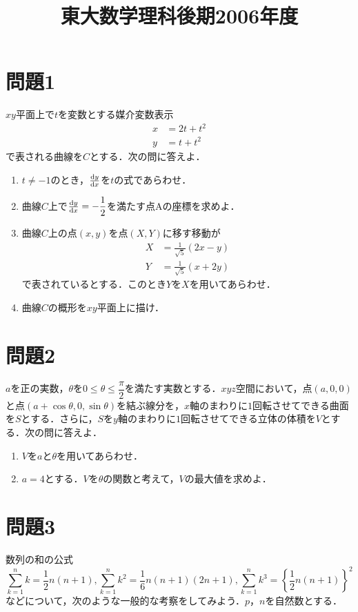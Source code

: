 \documentclass[unicode,12pt, A4j]{ltjsarticle}%
\title{東大数学理科後期2006年度}
\author{}
\date{}
\begin{document}
\maketitle

\section{問題1}
$xy$平面上で$t$を変数とする媒介変数表示
\begin{align}
 x&=2t+t^2 \\
 y&=t+t^2  
\end{align}
で表される曲線を$C$とする．次の問に答えよ．
\begin{enumerate}
 \item $t\neq -1$のとき，$\dv{y}{x}$を$t$の式であらわせ．
 \item 曲線$C$上で$\dv{y}{x}=-\dfrac{1}{2}$を満たす点$\mathrm{A}$の座標を求めよ．
 \item 曲線$C$上の点$(x,y)$を点$(X,Y)$に移す移動が
       \begin{align}
	  X&=\frac{1}{\sqrt{5}}(2x-y) \\
	  Y&=\frac{1}{\sqrt{5}}(x+2y) 
       \end{align}
       で表されているとする．このとき$Y$を$X$を用いてあらわせ．
 \item 曲線$C$の概形を$xy$平面上に描け．
\end{enumerate}


\section{問題2}
$a$を正の実数，$\theta$を$0\le\theta\le\dfrac{\pi}{2}$を満たす実数とする．$xyz$空間において，点$(a,0,0)$と点$(a+\cos\theta,0,\sin\theta)$を結ぶ線分を，$x$軸のまわりに$1$回転させてできる曲面を$S$とする．さらに，$S$を$y$軸のまわりに$1$回転させてできる立体の体積を$V$とする．次の問に答えよ．
\begin{enumerate}
 \item $V$を$a$と$\theta$を用いてあらわせ．
 \item $a=4$とする．$V$を$\theta$の関数と考えて，$V$の最大値を求めよ．
\end{enumerate}


\section{問題3}
数列の和の公式
\begin{equation}
 \sum_{k=1}^{n}k=\frac{1}{2}n(n+1),  \sum_{k=1}^{n}k^2=\frac{1}{6}n(n+1)(2n+1), \sum_{k=1}^{n}k^3=\left\{\frac{1}{2}n(n+1)\right\}^2
\end{equation}
などについて，次のような一般的な考察をしてみよう．$p$，$n$を自然数とする．
\end{document}
